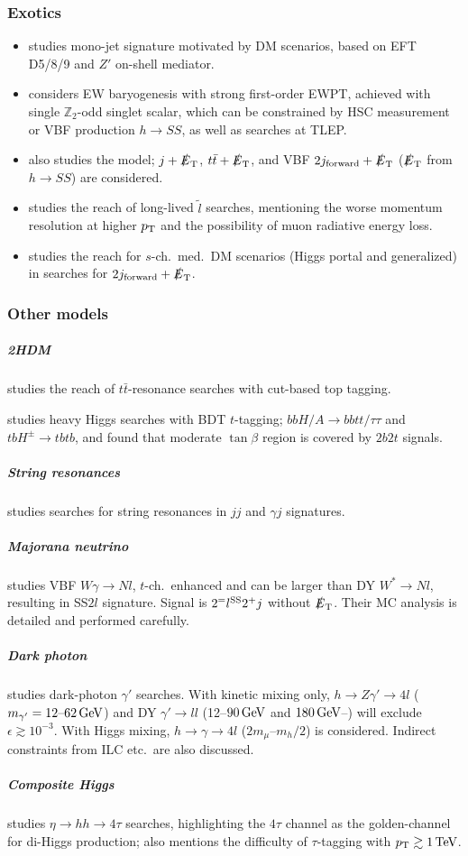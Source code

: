 \documentclass[10pt,a4paper]{article}
\newcommand{\TeV}{\,{\rm TeV}}
\newcommand{\GeV}{\,{\rm GeV}}
\newcommand{\s}[1]{_{\rm #1}}
\newcommand{\PT}{p\s{T}}
\newcommand{\MET}{\slashed{E}\s T}
\begin{document}
\subsubsection{Exotics}
 \begin{itemize}
 \item \cite{Zhou:2013raa} studies mono-jet signature motivated by DM scenarios, based on EFT D5/8/9 and $Z'$ on-shell mediator.
 \item \cite{Curtin:2014jma} considers EW baryogenesis with strong first-order EWPT, achieved with single $\mathbb Z_2$-odd singlet scalar, which can be constrained by HSC measurement or VBF production $h\to SS$, as well as searches at TLEP.
 \item \cite{Craig:2014lda} also studies the model; $j+\MET$, $t\bar t+\MET$, and VBF $2j\s{forward}+\MET$ ($\MET$ from $h\to SS$) are considered.

 \item \cite{Feng:2015wqa} studies the reach of long-lived $\tilde l$ searches, mentioning the worse momentum resolution at higher $\PT$ and the possibility of muon radiative energy loss.

 \item \cite{Khoze:2015sra} studies the reach for $s$-ch.\ med.\ DM scenarios (Higgs portal and generalized) in searches for $2j\s{forward}+\MET$.
 \end{itemize}


\subsubsection{Other models}

\subparagraph{2HDM}
\cite{Auerbach:2014xua} studies the reach of $t\bar t$-resonance searches with cut-based top tagging.

\cite{Hajer:2015gka} studies heavy Higgs searches with BDT $t$-tagging; $bbH/A\to bbtt/\tau\tau$ and $tbH^\pm\to tbtb$, and found that moderate $\tan\beta$ region is covered by $2b2t$ signals.

\subparagraph{String resonances}
\cite{Anchordoqui:2014wha} studies searches for string resonances in $jj$ and $\gamma j$ signatures.


\subparagraph{Majorana neutrino}
\cite{Alva:2014gxa} studies VBF $W\gamma\to Nl$, $t$-ch.\ enhanced and can be larger than DY $W^*\to Nl$, resulting in SS$2l$ signature. Signal is $2^{=}l^{\rm SS}2^+j$ without $\MET$. Their MC analysis is detailed and performed carefully.


\subparagraph{Dark photon}
\cite{Curtin:2014cca} studies dark-photon $\gamma'$ searches. With kinetic mixing only, $h\to Z\gamma'\to 4l$ ($m_{\gamma'} =12\text{--}62\GeV$) and DY $\gamma'\to ll$ (12--$90\GeV$ and $180\GeV$--) will exclude $\epsilon\gtrsim10^{-3}$. With Higgs mixing, $h\to\gamma\to4l$ ($2m_\mu$--$m_h/2$) is considered. Indirect constraints from ILC etc.\ are also discussed.


\subparagraph{Composite Higgs}
\cite{Kotwal:2015rba} studies $\eta\to hh\to 4\tau$ searches, highlighting the $4\tau$ channel as the golden-channel for di-Higgs production; also mentions the difficulty of $\tau$-tagging with $\PT\gtrsim1\TeV$.


{\small

}
\end{document}
